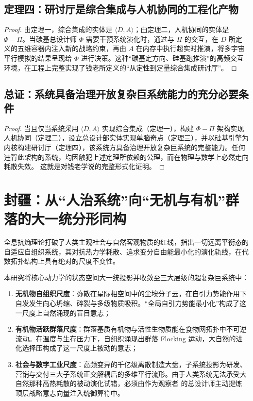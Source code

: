 \documentclass[11pt,a4paper]{article}
\begin{document}
\subsection*{定理四：研讨厅是综合集成与人机协同的工程化产物}
\begin{proof}
由定理一，综合集成的实体是 $\langle D,A \rangle$；由定理二，人机协同的实体是 $\Phi - \Pi$。当碳基总设计师 $\Phi$ 需要干预系统演化时，通过与 $\Pi$ 的交互，在 $D$ 所定义的五维容器内注入新的战略约束，再由 $A$ 在内存中执行超实时推演，将多宇宙平行模拟的结果呈现给 $\Phi$ 进行决策。这种“碳基定方向、硅基跑推演”的高频交互环境，在工程上完整实现了钱老所定义的“从定性到定量综合集成研讨厅”。
\end{proof}

\subsection*{总证：系统具备治理开放复杂巨系统能力的充分必要条件}
\begin{proof}
当且仅当系统采用 $\langle D,A \rangle$ 实现综合集成（定理一），构建 $\Phi - \Pi$ 架构实现人机协同（定理二），设立总设计部实体实现单脑奇点（定理三），并以硅基引擎为内核构建研讨厅（定理四），该系统方具备治理开放复杂巨系统的完整能力。任何违背此架构的系统，均因触犯上述定理所依赖的公理，而在物理与数学上必然走向耗散失效。
这就是对钱老学说的完整形式化证明。
\end{proof}

\section{封疆：从“人治系统”向“无机与有机”群落的大一统分形同构}

全息抗熵理论打破了人类主观社会与自然客观物质的红线，指出一切远离平衡态的自适应自组织系统，其对抗热力学耗散、追求变分自由能最小化的演化轨线，在代数拓扑结构上具有绝对的尺度不变性。

本研究将核心动力学的状态空间大一统投影并收敛至三大层级的超复杂巨系统中：
\begin{enumerate}
    \item \textbf{无机物自组织尺度}：弥散在星际相空间中的尘埃分子云，在自引力势能作用下自发发生向心坍缩、碎裂与多级物质吸积。“全局自引力势能最小化”构成了这一尺度上自然涌现的盲目意志；
    \item \textbf{有机物活跃群落尺度}：群落基质有机物与活性生物质能在食物网拓扑中不可逆流动。在温度与生存压力下，自组织涌现出群落 Flocking 运动，大自然的进化选择压构成了这一尺度上被动的意志；
    \item \textbf{社会与数字工业尺度}：高频变异的千亿级离散制造大盘，子系统投影为研发、营销与交付三大子系统正交解耦后的多维平行流形。由于人类系统无法承受大自然那种高热耗散的被动演化试错，必须由作为观察者
的总设计师主动提炼顶层战略意志向量注入统御算符中。
\end{enumerate}
\end{document}
